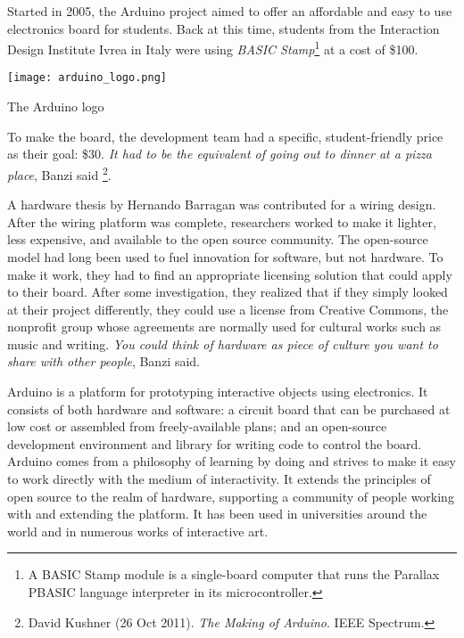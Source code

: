 Started in 2005, the Arduino project aimed to offer an affordable and easy to use electronics board for students.
Back at this time, students from the Interaction Design Institute Ivrea in Italy were using \emph{BASIC Stamp}\footnote{A BASIC Stamp module is a single-board computer that runs the Parallax PBASIC language interpreter in its microcontroller.} at a cost of \$100.

\begin{NFfigure}
    \begin{center}
        \texttt{[image: arduino\_logo.png]}
    \caption{The Arduino logo}
    \label{fig:arduino_logo}
    \end{center}
\end{NFfigure}

To make the board, the development team had a specific, student-friendly price as their goal: \$30.
\emph{It had to be the equivalent of going out to dinner at a pizza place}, Banzi said \footnote{David Kushner (26 Oct 2011).
\emph{The Making of Arduino}.
IEEE Spectrum.}.

A hardware thesis by Hernando Barragan\cite{barragan2004wiring} was contributed for a wiring design.
After the wiring platform was complete, researchers worked to make it lighter, less expensive, and available to the open source community.
The open-source model had long been used to fuel innovation for software, but not hardware.
To make it work, they had to find an appropriate licensing solution that could apply to their board.
After some investigation, they realized that if they simply looked at their project differently, they could use a license from Creative Commons, the nonprofit group whose agreements are normally used for cultural works such as music and writing.
\emph{You could think of hardware as piece of culture you want to share with other people}, Banzi said.

Arduino is a platform for prototyping interactive objects using electronics.
It consists of both hardware and software: a circuit board that can be purchased at low cost or assembled from freely-available plans; and an open-source development environment and library for writing code to control the board.
Arduino comes from a philosophy of learning by doing and strives to make it easy to work directly with the medium of interactivity.
It extends the principles of open source to the realm of hardware, supporting a community of people working with and extending the platform.
It has been used in universities around the world and in numerous works of interactive art.\cite{mellis2007arduino}



